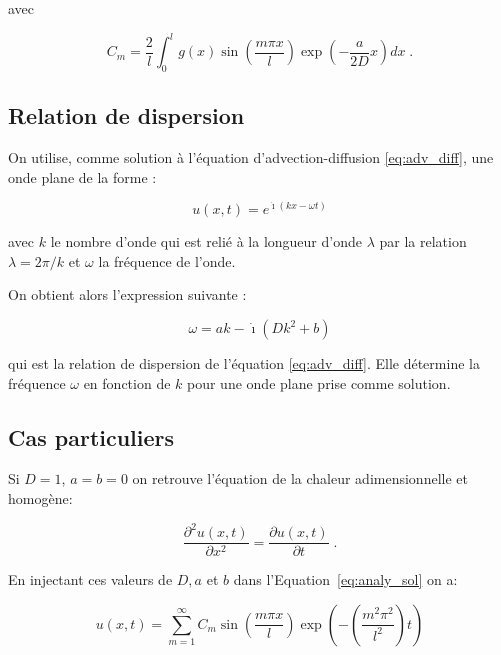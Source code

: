 \documentclass[a4paper, 12pt]{report}
\begin{document}
avec

\begin{equation}
  \boxed{C_m = \frac{2}{l} \int_0^l g(x) \sin \left (\frac{m \pi x}{l} \right ) \exp \left ( -\frac{a}{2D} x \right ) dx}\;.
\end{equation}


\subsection*{Relation de dispersion}

On utilise, comme solution à l'équation d'advection-diffusion \eqref{eq:adv_diff}, une onde plane de la forme :

\begin{equation}
  u(x,t) = e^{\dot{\imath}\left(kx-\omega t\right)}
\end{equation}

avec $k$ le nombre d'onde qui est relié à la longueur d'onde $\lambda$ par la relation $\lambda = 2\pi/k$ et $\omega$ la fréquence de l'onde.

On obtient alors l'expression suivante :

\begin{equation}
  \omega = ak-\dot{\imath}\left(Dk^{2}+b\right)
\end{equation}

qui est la relation de dispersion de l'équation \eqref{eq:adv_diff}. Elle détermine la fréquence $\omega$ en fonction de $k$ pour une onde plane prise comme solution.

\subsection*{Cas particuliers}

Si $D=1$, $a=b=0$ on retrouve l'équation de la chaleur adimensionnelle et homogène:

\begin{equation}
  \frac{\partial^2 u(x,t)}{\partial x^2} = \frac{\partial u(x,t)}{\partial t}\;.
\end{equation}

En injectant ces valeurs de $D,a$ et $b$ dans l'Equation~\ref{eq:analy_sol} on a:

 \begin{equation}
   u(x,t) = \sum_{m=1}^{\infty} C_m \sin \left (\frac{m \pi x}{l} \right ) \exp \left ( - \left (\frac{m^2 \pi^2}{l^2} \right ) t \right )
 \end{equation}
\end{document}
